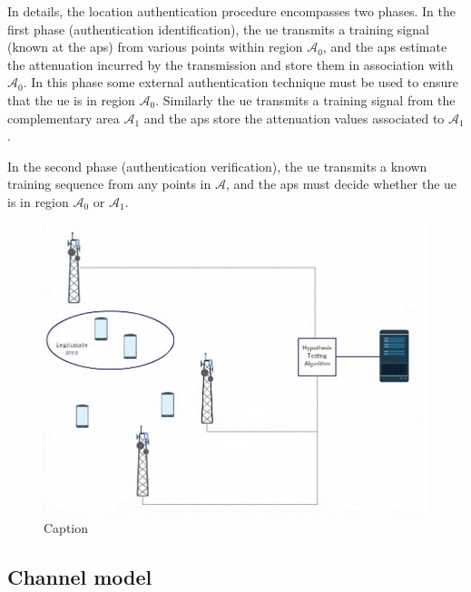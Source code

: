 \documentclass[draftcls,onecolumn,12pt]{IEEEtran}
\begin{document}
In details, the location authentication procedure encompasses two phases. In the first phase (authentication identification), the \ac{ue} transmits a training signal (known at the \acp{ap}) from various points within region $\mathcal{A}_0$, and the \acp{ap} estimate the attenuation incurred by the transmission and store them in association with $\mathcal{A}_0$. In this phase some external authentication technique must be used to ensure that the \ac{ue} is in region $\mathcal{A}_0$. Similarly the \ac{ue} transmits a training signal from the complementary area $\mathcal{A}_1$ and the \acp{ap} store the attenuation values  associated to $\mathcal{A}_1$.

In the second phase (authentication verification), the \ac{ue} transmits a known training sequence from any points in $\mathcal{A}$, and the \acp{ap} must decide whether the \ac{ue} is in region $\mathcal{A}_0$ or $\mathcal{A}_1$.

\begin{figure}
    \centering
    \includegraphics[width=0.8\columnwidth]{irlv.png}
    \caption{Caption}
    \label{fig:my_label}
\end{figure}

\subsection{Channel model}
\end{document}
